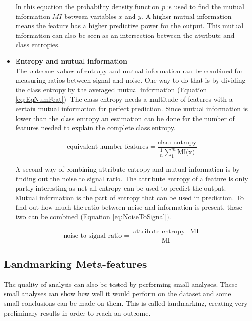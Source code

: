 \documentclass[10pt,a4paper]{article}
\begin{document}
\begin{itemize}
		In this equation the probability density function $p$ is used to find the mutual information $MI$ between variables $x$ and $y$\cite{peng2005feature}. A higher mutual information means the feature has a higher predictive power for the output. This mutual information can also be seen as an intersection between the attribute and class entropies.
		
		\item \textbf{Entropy and mutual information} \\
		The outcome values of entropy and mutual information can be combined for measuring ratios between signal and noise. One way to do that is by dividing the class entropy by the averaged mutual information (Equation \ref{eq:EqNumFeat}). The class entropy needs a multitude of features with a certain mutual information for perfect prediction. Since mutual information is lower than the class entropy an estimation can be done for the number of features needed to explain the complete class entropy.
		
		\begin{equation}\label{eq:EqNumFeat}
		\text{equivalent number features} = \frac{\text{class entropy}}{\frac{1}{n}\sum_1^m\text{MI(x)}}
		\end{equation}
		
		A second way of combining attribute entropy and mutual information is by finding out the noise to signal ratio. The attribute entropy of a feature is only partly interesting as not all entropy can be used to predict the output. Mutual information is the part of entropy that can be used in prediction. To find out how much the ratio between noise and information is present, these two can be combined (Equation \ref{eq:NoiseToSignal}).
		
		\begin{equation}\label{eq:NoiseToSignal}
		\text{noise to signal ratio} = \frac{\text{attribute entropy} - \text{MI}}{\text{MI}}
		\end{equation}
		
	\end{itemize}
	
	\subsection{Landmarking Meta-features}
	\label{subsec:LandmarkingMF}
	
	The quality of analysis can also be tested by performing small analyses. These small analyses can show how well it would perform on the dataset and some small conclusions can be made on them. This is called landmarking, creating very preliminary results in order to reach an outcome\cite{pfahringer2000meta}.
	
\end{document}
